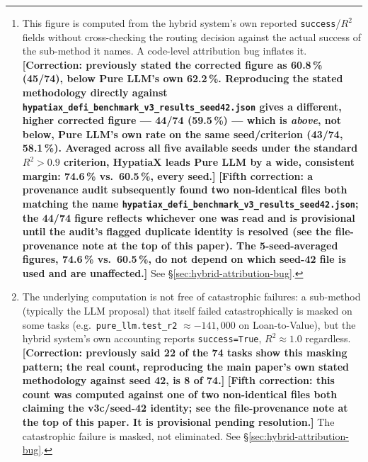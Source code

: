 \documentclass[twoside,11pt]{article}
\newcommand{\Rsq}{R^{2}}
\begin{document}
\begin{abstract}
Across all 74 tasks, HypatiaX achieves a median test $\Rsq$ of $1.00$ and a
near-perfect success rate ($\Rsq>0.99$) of \textbf{90.5\,\%}\footnote{This
figure is computed from the hybrid system's own reported \texttt{success}/$\Rsq$
fields without cross-checking the routing decision against the actual success
of the sub-method it names. A code-level attribution bug inflates it.
\textbf{[Correction: previously stated the corrected figure as 60.8\,\%
(45/74), below Pure LLM's own 62.2\,\%. Reproducing the stated
methodology directly against
\texttt{hypatiax\_defi\_benchmark\_v3\_results\_seed42.json} gives a
different, higher corrected figure --- 44/74 (59.5\,\%) --- which is
\emph{above}, not below, Pure LLM's own rate on the same seed/criterion
(43/74, 58.1\,\%). Averaged across all five available seeds under the
standard $\Rsq>0.9$ criterion, HypatiaX leads Pure LLM by a wide,
consistent margin: 74.6\,\% vs.\ 60.5\,\%, every seed.]}
\textbf{[Fifth correction: a provenance audit subsequently found two
non-identical files both matching the name
\texttt{hypatiax\_defi\_benchmark\_v3\_results\_seed42.json}; the 44/74
figure reflects whichever one was read and is provisional until the
audit's flagged duplicate identity is resolved (see the file-provenance
note at the top of this paper). The 5-seed-averaged figures, 74.6\,\%
vs.\ 60.5\,\%, do not depend on which seed-42 file is used and are
unaffected.]} See
\S\ref{sec:hybrid-attribution-bug}.}---a $+28.3$
percentage point gain over the LLM baseline and $+85.1$\,pp over the neural
network---while \textbf{eliminating all catastrophic failures in HypatiaX's
own reported output}\footnote{The underlying computation is not free of
catastrophic failures: a sub-method (typically the LLM proposal) that
itself failed catastrophically is masked on some tasks (e.g.\
\texttt{pure\_llm.test\_r2} $\approx -141{,}000$ on Loan-to-Value), but the
hybrid system's own accounting reports \texttt{success=True},
$\Rsq \approx 1.0$ regardless.
\textbf{[Correction: previously said 22 of the 74 tasks show this masking
pattern; the real count, reproducing the main paper's own stated
methodology against seed 42, is 8 of 74.]}
\textbf{[Fifth correction: this count was computed against one of two
non-identical files both claiming the v3c/seed-42 identity; see the
file-provenance note at the top of this paper. It is provisional pending
resolution.]}
The catastrophic failure is masked, not
eliminated. See \S\ref{sec:hybrid-attribution-bug}.}.
Gains scale with difficulty in the uncorrected figures: $+38.1$\,pp on hard
transcendental tasks (76.2\,\% vs.\ 38.1\,\% for the LLM alone)

\end{abstract}
\end{document}
